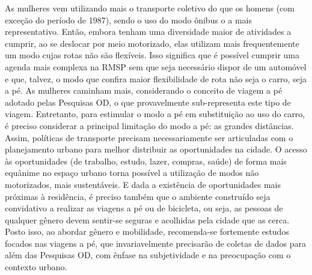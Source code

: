 As mulheres vem utilizando mais o transporte coletivo do que os homens (com exceção do período de 1987), sendo o uso do modo ônibus o a mais representativo.
Então, embora tenham uma diversidade maior de atividades a cumprir, ao se deslocar por meio motorizado, elas utilizam mais frequentemente um modo cujas rotas não são flexíveis.
Isso significa que é possível cumprir uma agenda mais complexa na RMSP sem que seja necessário dispor de um automóvel e que, talvez, o modo que confira maior flexibilidade de rota não seja o carro, seja a pé.
As mulheres caminham mais, considerando o conceito de viagem a pé adotado pelas Pesquisas OD, o que provavelmente sub-representa este tipo de viagem.
Entretanto, para estimular o modo a pé em substituição ao uso do carro, é preciso considerar a principal limitação do modo a pé: as grandes distâncias. 
Assim, políticas de transporte precisam necessariamente ser articuladas com o planejamento urbano para melhor distribuir as oportunidades na cidade. 
O acesso às oportunidades (de trabalho, estudo, lazer, compras, saúde) de forma mais equânime no espaço urbano torna possível a utilização de modos não motorizados, mais sustentáveis. 
E dada a existência de oportunidades mais próximas à residência, é preciso também que o ambiente construído seja convidativo a realizar as viagens a pé ou de bicicleta, ou seja, as pessoas de qualquer gênero devem sentir-se seguras e acolhidas pela cidade que as cerca. 
Posto isso, ao abordar gênero e mobilidade, recomenda-se fortemente estudos focados nas viagens a pé, que invariavelmente precisarão de coletas de dados para além das Pesquisas OD, com ênfase na subjetividade e na preocupação com o contexto urbano.


